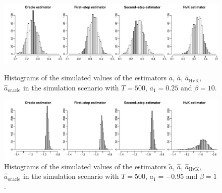 \begin{figure}[t!]
\centering
\includegraphics[width=\linewidth]{Plots/variance_histogram_1.pdf}
\caption{Histograms of the simulated values of the estimators $\widetilde{a}$, $\widehat{a}$, $\widehat{a}_{\text{HvK}}$, $\widehat{a}_{\text{oracle}}$ in the simulation scenario with $T=500$, $a_1 = 0.25$ and $\beta = 10$.}\label{fig:hist_AR_scenario1} 
\vspace{0.25cm}

\includegraphics[width=\linewidth]{Plots/variance_histogram_2.pdf}
\caption{Histograms of the simulated values of the estimators $\widetilde{a}$, $\widehat{a}$, $\widehat{a}_{\text{HvK}}$, $\widehat{a}_{\text{oracle}}$ in the simulation scenario with $T=500$, $a_1 = -0.95$ and $\beta = 1$.}\label{fig:hist_AR_scenario2}
\end{figure}


